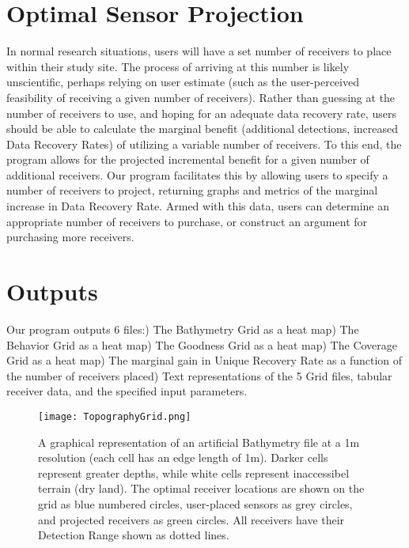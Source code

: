 \section{Optimal Sensor Projection}
In normal research situations, users will have a set number of receivers to place within their study site.  The process of arriving at this number is likely unscientific, perhaps relying on user estimate (such as the user-perceived feasibility of receiving a given number of receivers).  Rather than guessing at the number of receivers to use, and hoping for an adequate data recovery rate, users should be able to calculate the marginal benefit (additional detections, increased Data Recovery Rates) of utilizing a variable number of receivers.   To this end, the program allows for the projected incremental benefit for a given number of additional receivers.  Our program facilitates this by allowing users to specify a number of receivers to project, returning graphs and metrics of the marginal increase in Data Recovery Rate.  Armed with this data, users can determine an appropriate number of receivers to purchase, or construct an argument for purchasing more receivers.

\section{Outputs}
Our program outputs 6 files:) The Bathymetry Grid as a heat map) The Behavior Grid as a heat map) The Goodness Grid as a heat map) The Coverage Grid as a heat map) The marginal gain in Unique Recovery Rate as a function of the number of receivers placed) Text representations of the 5 Grid files, tabular receiver data, and the specified input parameters.\newline
\begin{figure}[h!]
	\label{outputGraphs}
		\texttt{[image: TopographyGrid.png]}
		\caption{A graphical representation of an artificial Bathymetry file at a 1m resolution (each cell has an edge length of 1m).  Darker cells represent greater depths, while white cells represent inaccessibel terrain (dry land).  The optimal receiver locations are shown on the grid as blue numbered circles, user-placed sensors as grey circles, and projected receivers as green circles.  All receivers have their Detection Range shown as dotted lines.}\label{bathyGraph}
	\end{figure}
	

